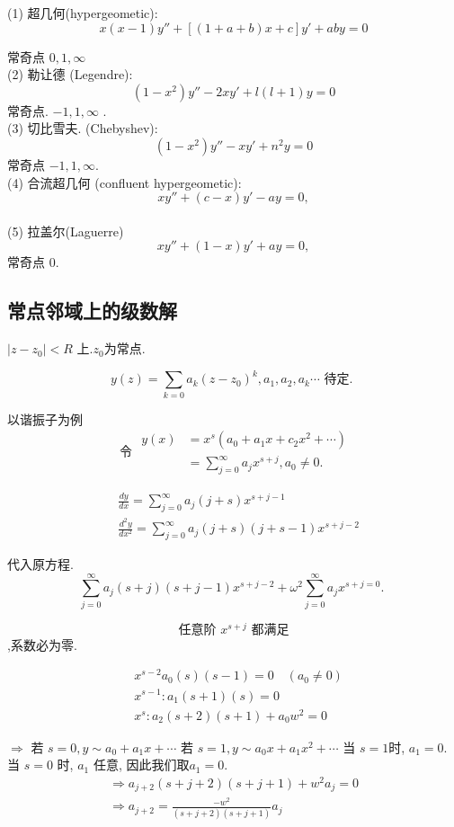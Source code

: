 (1) 超几何(hypergeometic):
$$
x(x-1) y''+[(1+a+b) x+c] y'+a b y= 0
$$

常奇点 $0,1, \infty$\\
(2) 勒让德 (Legendre):
$$
\left(1-x^2\right) y''-2 x y'+l(l+1) y=0
$$
常奇点. $-1,1, \infty$ .\\
(3) 切比雪夫. (Chebyshev):
$$
\left(1-x^2\right) y''-x y'+n^2 y=0 
$$
常奇点 $-1,1, \infty$.\\

(4) 合流超几何 (confluent hypergeometic):
$$
x y''+(c-x) y'-a y=0,
$$
\\
(5) 拉盖尔(Laguerre)
$$
x y''+(1-x) y'+a y=0,
$$
常奇点 $0$.

\subsection{常点邻域上的级数解}
$\left|z-z_0\right|<R$ 上.$z_0$为常点.

$$
y(z)=\sum_{k=0} a_k\left(z-z_0\right)^k, a_1, a_2, a_k \cdots \text { 待定. }
$$


以谐振子为例
$$
\text { 令 } \begin{aligned}
y(x) & =x^s\left(a_0+a_1 x+c_2 x^2+\cdots\right) \\
& =\sum_{j=0}^{\infty} a_j x^{s+j}, a_0 \neq 0 .
\end{aligned}
$$

$$
\begin{aligned}
& \frac{d y}{d x}=\sum_{j=0}^{\infty} a_j(j+s) x^{s+j-1} \\
& \frac{d^2 y}{d x^2}=\sum_{j=0}^{\infty} a_j(j+s)(j+s-1) x^{s+j-2}
\end{aligned}
$$

代入原方程.
$$
\sum_{j=0}^{\infty} a_j(s+j)(s+j-1) x^{s+j-2}+\omega^2 \sum_{j=0}^{\infty} a_j x^{s+j=0} \text {. }
$$

$$
\text { 任意阶 } x^{s+j} \text { 都满足 }
$$
,系数必为零.

$$
\begin{aligned}
& x^{s-2} a_0(s)(s-1)=0 \quad\left(a_0 \neq 0\right) \\
& x^{s-1}: a_1(s+1)(s)=0 \\
& x^s: a_2(s+2)(s+1)+a_0 w^2=0
\end{aligned}
$$

$\Rightarrow$ 若 $s=0, y \sim  a_0+a_1 x+\cdots$
若 $s=1, y \sim a_0 x+a_1 x^2+\cdots$
当 $s=1$时, $a_1=0$.
当 $s=0$ 时, $a_1$ 任意, 因此我们取$a_1=0$.
$$
\begin{gathered}
\Rightarrow a_{j+2}(s+j+2)(s+j+1)+w^2 a_j=0 \\
\Rightarrow a_{j+2}=\frac{-w^2}{(s+j+2)(s+j+1)} a_j
\end{gathered}
$$

